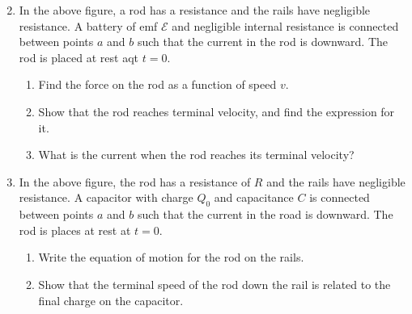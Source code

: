\documentclass[11pt]{article}
\newcommand{\mb}[1]{\ensuremath\mathbf{#1}}
\begin{document}
\begin{center}
\end{center}

\begin{enumerate}[leftmargin=18pt]
  \setcounter{enumi}{1}
\item In the above figure, a rod has a resistance and the rails have negligible
  resistance. A battery of emf $\mathcal{E}$ and negligible internal resistance
  is connected between points $a$ and $b$ such that the current in the rod is
  downward. The rod is placed at rest aqt $t=0$.
  \begin{enumerate}[noitemsep]
  \item Find the force on the rod as a function of speed $v$.
  \item Show that the rod reaches terminal velocity, and find the expression for
    it.
  \item What is the current when the rod reaches its terminal velocity?
  \end{enumerate}
  \vspace{2in}
  
\item In the above figure, the rod has a resistance of $R$ and the rails have
  negligible resistance. A capacitor with charge $Q_0$ and capacitance $C$ is
  connected between points $a$ and $b$ such that the current in the road is
  downward. The rod is places at rest at $t=0$.
  \begin{enumerate}[noitemsep]
  \item Write the equation of motion for the rod on the rails.
  \item Show that the terminal speed of the rod down the rail is related to the
    final charge on the capacitor.
  \end{enumerate}
\end{enumerate}
\newpage
\begin{center}
\end{center}
\end{document}
